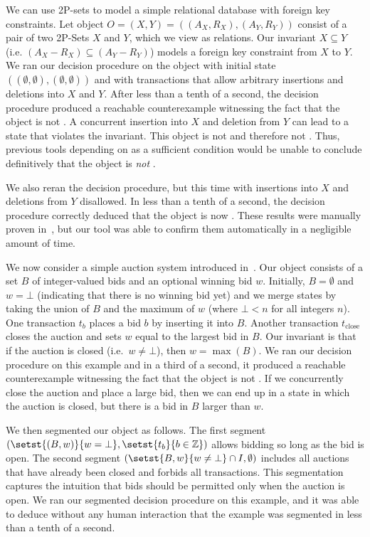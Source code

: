 We can use 2P-sets to model a simple relational database with foreign key
constraints. Let object $O = (X, Y) = ((A_X, R_X), (A_Y, R_Y))$ consist of a
pair of two 2P-Sets $X$ and $Y$, which we view as relations. Our invariant $X
\subseteq Y$ (i.e. $(A_X - R_X) \subseteq (A_Y - R_Y)$) models a foreign key
constraint from $X$ to $Y$. We ran our decision procedure on the object with
initial state $((\emptyset, \emptyset), (\emptyset, \emptyset))$ and with
transactions that allow arbitrary insertions and deletions into $X$ and $Y$.
After less than a tenth of a second, the decision procedure produced a
reachable counterexample witnessing the fact that the object is not
\invariantconfluent{}. A concurrent insertion into $X$ and deletion from $Y$
can lead to a state that violates the invariant. This object is not
\invariantconfluent{} and therefore not \invariantclosed{}. Thus, previous
tools depending on \invariantclosure{} as a sufficient condition would be
unable to conclude definitively that the object is \emph{not}
\invariantconfluent{}.

We also reran the decision procedure, but this time with insertions into $X$
and deletions from $Y$ disallowed. In less than a tenth of a second, the
decision procedure correctly deduced that the object is now
\invariantconfluent{}. These results were manually proven
in~\cite{bailis2014coordination}, but our tool was able to confirm them
automatically in a negligible amount of time.

\example[Auction]
We now consider a simple auction system introduced in~\cite{gotsman2016cause}.
Our object consists of a set $B$ of integer-valued bids and an optional winning
bid $w$. Initially, $B = \emptyset$ and $w = \bot$ (indicating that there is no
winning bid yet) and we merge states by taking the union of $B$ and the maximum
of $w$ (where $\bot < n$ for all integers $n$). One transaction $t_b$ places a
bid $b$ by inserting it into $B$. Another transaction $t_\text{close}$ closes
the auction and sets $w$ equal to the largest bid in $B$. Our invariant is that
if the auction is closed (i.e.\ $w \neq \bot$), then $w = \max(B)$. We ran our
decision procedure on this example and in a third of a second, it produced a
reachable counterexample witnessing the fact that the object is not
\invariantconfluent{}.  If we concurrently close the auction and place a large
bid, then we can end up in a state in which the auction is closed, but there is
a bid in $B$ larger than $w$.

We then segmented our object as follows. The first segment $(\setst{(B, w)}{w =
\bot}, \setst{t_b}{b \in \ints})$ allows bidding so long as the bid is open.
The second segment $(\setst{B, w}{w \neq \bot} \cap I, \emptyset)$ includes all
auctions that have already been closed and forbids all transactions. This
segmentation captures the intuition that bids should be permitted only when the
auction is open. We ran our segmented \invariantconfluence{} decision procedure
on this example, and it was able to deduce without any human interaction that
the example was segmented \invariantconfluent{} in less than a tenth of a
second.

